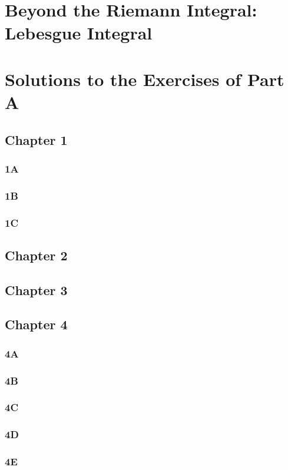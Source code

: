 \chapter{Beyond the Riemann Integral: Lebesgue Integral}
\chapter{Solutions to the Exercises of Part A}
\section*{Chapter 1}
\subsection*{1A}
\subsection*{1B}
\subsection*{1C}
\section*{Chapter 2}
\section*{Chapter 3}
\section*{Chapter 4}
\subsection*{4A}
\subsection*{4B}
\subsection*{4C}
\subsection*{4D}
\subsection*{4E}